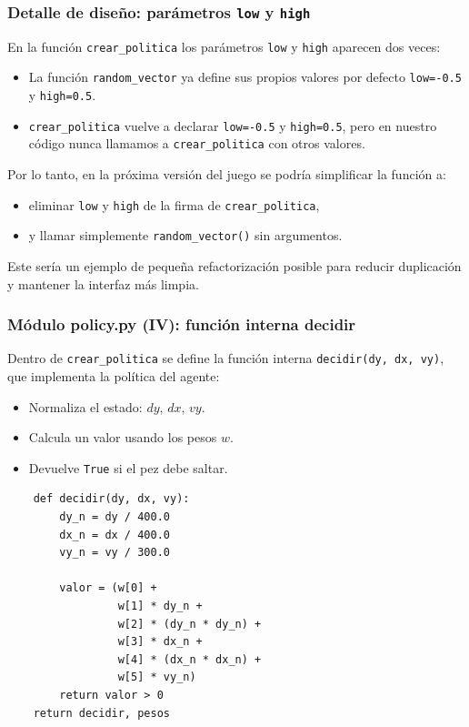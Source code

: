 \documentclass[
	11pt, %
]{beamer}
\begin{document}
\begin{frame}
\frametitle{Detalle de diseño: parámetros \texttt{low} y \texttt{high}}

En la función \texttt{crear\_politica} los parámetros \texttt{low} y \texttt{high}
aparecen dos veces:

\begin{itemize}
    \item La función \texttt{random\_vector} ya define sus propios valores
          por defecto \texttt{low=-0.5} y \texttt{high=0.5}.
    \item \texttt{crear\_politica} vuelve a declarar \texttt{low=-0.5} y
          \texttt{high=0.5}, pero en nuestro código nunca llamamos a
          \texttt{crear\_politica} con otros valores.
\end{itemize}

Por lo tanto, en la próxima versión del juego se podría simplificar la función a:

\begin{itemize}
    \item eliminar \texttt{low} y \texttt{high} de la firma de
          \texttt{crear\_politica},
    \item y llamar simplemente \texttt{random\_vector()} sin argumentos.
\end{itemize}

Este sería un ejemplo de pequeña refactorización posible para reducir
duplicación y mantener la interfaz más limpia.
\end{frame}


\begin{frame}[fragile]
\frametitle{Módulo policy.py (IV): función interna decidir}

Dentro de \texttt{crear\_politica} se define la función interna
\texttt{decidir(dy, dx, vy)}, que implementa la política del agente:

\begin{itemize}
    \item Normaliza el estado: $dy$, $dx$, $vy$.
    \item Calcula un valor usando los pesos $w$.
    \item Devuelve \texttt{True} si el pez debe saltar.
\end{itemize}

\vspace{4pt}

{\scriptsize
\begin{verbatim}
    def decidir(dy, dx, vy):
        dy_n = dy / 400.0
        dx_n = dx / 400.0
        vy_n = vy / 300.0

        valor = (w[0] +
                 w[1] * dy_n +
                 w[2] * (dy_n * dy_n) +
                 w[3] * dx_n +
                 w[4] * (dx_n * dx_n) +
                 w[5] * vy_n)
        return valor > 0
    return decidir, pesos
\end{verbatim}
}
\end{frame}
\end{document}
